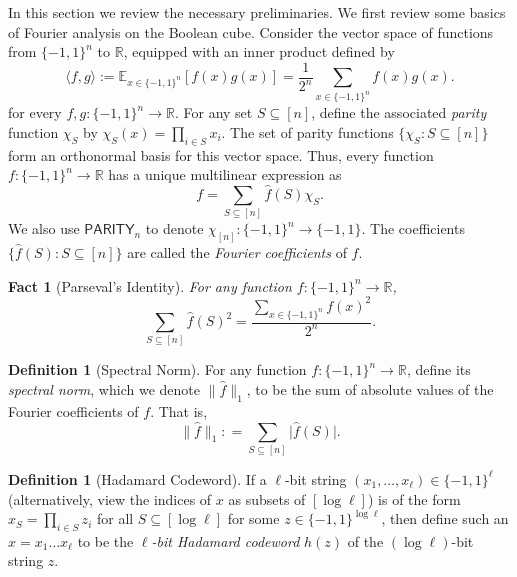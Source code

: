 \documentclass[10pt,a4paper]{article}
\newtheorem{fact}[theorem]{Fact}
\theoremstyle{definition}
\newtheorem{definition}[theorem]{Definition}
\newcommand{\bra}[1]{\{#1\}}
\newcommand{\pmone}{\bra{-1,1}}
\newcommand{\R}{\mathbb R}
\newcommand{\E}{\mathbb E}
\newcommand{\wh}{\widehat}
\newcommand{\abs}[1]{\lvert#1\rvert}
\newcommand{\snorm}[1]{\|\widehat{#1}\|_1}
\newcommand{\PARITY}{\mathsf{PARITY}}
\begin{document}
In this section we review the necessary preliminaries.  We first review some basics of Fourier analysis on the Boolean cube.
Consider the vector space of functions from $\pmone^n$ to $\R$, equipped with an inner product defined by
\[
\langle f, g \rangle := \E_{x \in \pmone^n}[f(x)g(x)] = \frac{1}{2^n}\sum_{x \in \pmone^n}f(x)g(x).
\]
for every $f,g: \pmone^n \rightarrow \R$. For any set $S \subseteq [n]$, define the associated \emph{parity} function $\chi_S$ by $\chi_S(x) = \prod_{i \in S}x_i$. The set of parity functions $\bra{\chi_S : S \subseteq [n]}$ form an orthonormal basis for this vector space.  Thus, every function $f : \pmone^n \to \R$ has a unique multilinear expression as
\[
f = \sum_{S \subseteq [n]}\wh{f}(S)\chi_S.
\]
We also use $\PARITY_n$ to denote $\chi_{[n]}:\pmone^n\to\pmone$.
The coefficients $\bra{\wh{f}(S) : S \subseteq [n]}$ are called the \emph{Fourier coefficients} of $f$.
\begin{fact}[Parseval's Identity]\label{fact: parseval}
For any function $f : \pmone^n \to \R$,
\[
    \sum_{S \subseteq [n]}\wh{f}(S)^2 = \frac{\sum_{x \in \pmone^n}f(x)^2}{2^n}.
\]
\end{fact}

\begin{definition}[Spectral Norm]\label{defn: wt}
For any function $f : \pmone^n \to \R$, define its \emph{spectral norm}, which we denote $\snorm{f}$, to be the sum of absolute values of the Fourier coefficients of $f$.  That is,
\[
\snorm{f} : = \sum_{S \subseteq [n]}\abs{\wh{f}(S)}.
\]
\end{definition}

\begin{definition}[Hadamard Codeword]\label{defn: hcwd}
If a $\ell$-bit string $(x_1, \dots, x_{\ell}) \in \pmone^\ell$ (alternatively, view the indices of $x$ as subsets of $[\log\ell]$) is of the form $x_S = \prod_{i \in S}z_i$ for all $S \subseteq [\log \ell]$ for some $z \in \pmone^{\log \ell}$, then define such an $x = x_1 \dots x_\ell$ to be the \emph{$\ell$-bit Hadamard codeword} $h(z)$ of the $(\log \ell)$-bit string $z$.
\end{definition}
\end{document}
